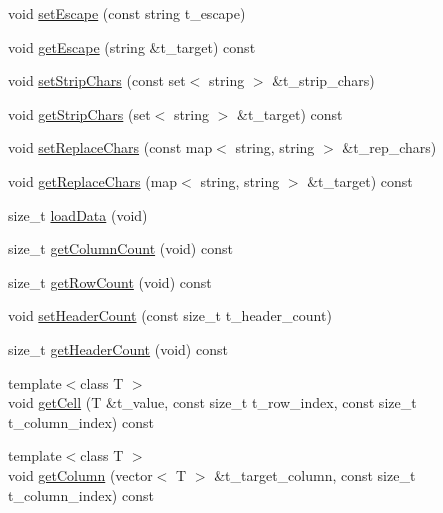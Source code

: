\begin{DoxyCompactItemize}
\item 
void \hyperlink{classutils_1_1SlightCSV_adea39a71336eeacd17b66326deb92544}{set\+Escape} (const string t\+\_\+escape)
\item 
void \hyperlink{classutils_1_1SlightCSV_aca0cbc1e472dbe7b7a774d6add7c482f}{get\+Escape} (string \&t\+\_\+target) const
\item 
void \hyperlink{classutils_1_1SlightCSV_ad432022553ea99a4719f618378abe586}{set\+Strip\+Chars} (const set$<$ string $>$ \&t\+\_\+strip\+\_\+chars)
\item 
void \hyperlink{classutils_1_1SlightCSV_aa6b302e67d367daab0dc806624a627da}{get\+Strip\+Chars} (set$<$ string $>$ \&t\+\_\+target) const
\item 
void \hyperlink{classutils_1_1SlightCSV_a53c0ef807f8b40b124ffcda2df863b5f}{set\+Replace\+Chars} (const map$<$ string, string $>$ \&t\+\_\+rep\+\_\+chars)
\item 
void \hyperlink{classutils_1_1SlightCSV_a4223375a011075fe889fc82db2babe4e}{get\+Replace\+Chars} (map$<$ string, string $>$ \&t\+\_\+target) const
\item 
size\+\_\+t \hyperlink{classutils_1_1SlightCSV_adea079ec76c9ee67d096f8fd39946380}{load\+Data} (void)
\item 
size\+\_\+t \hyperlink{classutils_1_1SlightCSV_a5dcd159ef127b63942bce5498beb8dae}{get\+Column\+Count} (void) const
\item 
size\+\_\+t \hyperlink{classutils_1_1SlightCSV_a5286060190553fe7eceb973bba22ae22}{get\+Row\+Count} (void) const
\item 
void \hyperlink{classutils_1_1SlightCSV_aae3c78a070879263d270a494e1dfcbca}{set\+Header\+Count} (const size\+\_\+t t\+\_\+header\+\_\+count)
\item 
size\+\_\+t \hyperlink{classutils_1_1SlightCSV_a781ae99927f2b8d704add6a2a53e0051}{get\+Header\+Count} (void) const
\item 
{\footnotesize template$<$class T $>$ }\\void \hyperlink{classutils_1_1SlightCSV_a1a95207d5d490c2c7d2ff74fab65ec1d}{get\+Cell} (T \&t\+\_\+value, const size\+\_\+t t\+\_\+row\+\_\+index, const size\+\_\+t t\+\_\+column\+\_\+index) const
\item 
{\footnotesize template$<$class T $>$ }\\void \hyperlink{classutils_1_1SlightCSV_aef948e3ae1b8ef76cf9e29a8f4344264}{get\+Column} (vector$<$ T $>$ \&t\+\_\+target\+\_\+column, const size\+\_\+t t\+\_\+column\+\_\+index) const
\item 

\end{DoxyCompactItemize}

